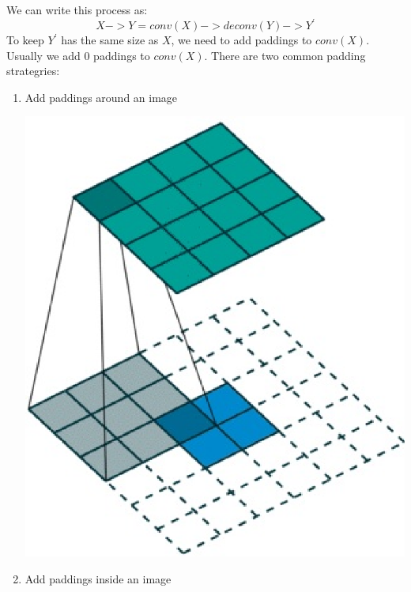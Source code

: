 \documentclass{article}
\begin{document}
We can write this process as:
\[
X -> Y = conv(X) -> deconv(Y) -> Y^\prime
\]
To keep $Y^\prime$ has the same size as $X$, we need to add paddings to $conv(X)$. Usually we add 0 paddings to $conv(X)$. There are two common padding strategries:
\begin{enumerate}
\item{Add paddings around an image}
\begin{center}
\includegraphics[scale=0.5]{spad}
\end{center}
\item{Add paddings inside an image}
\begin{center}

\end{center}
\end{enumerate}
\end{document}
